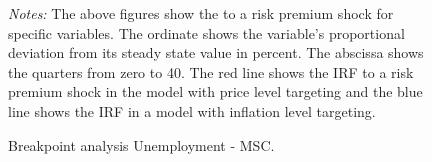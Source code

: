 \documentclass[11pt, a4paper, leqno]{article}
\begin{document}
\begin{figure}[ht!]
	\caption{Breakpoint analysis Unemployment - MSC.}
	\centering
    	\bigskip
	\begin{minipage}{\textwidth}%
		\footnotesize\setlength{\baselineskip}{11pt}%
		\bigskip \textit{Notes:} The above figures show the  to a risk premium shock for specific variables. The ordinate shows the variable's proportional deviation from its steady state value in percent. The abscissa shows the quarters from zero to 40. The red line shows the IRF to a risk premium shock in the model with price level targeting and the blue line shows the IRF in a model with inflation level targeting.
	\end{minipage}
\end{figure}
\end{document}
